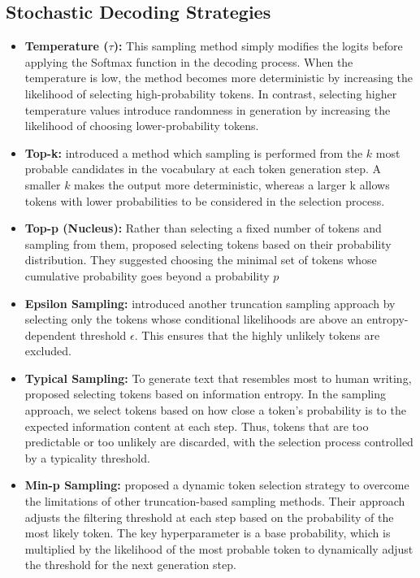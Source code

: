\subsection{Stochastic Decoding Strategies}
\label{stochastic decoding}

\begin{itemize}\itemsep0em 
    \item \textbf{Temperature (\( \tau\)):} This sampling method simply modifies the logits before applying the Softmax \cite{bridle} function in the decoding process. When the temperature is low, the method becomes more deterministic by increasing the likelihood of selecting high-probability tokens. In contrast, selecting higher temperature values introduce randomness in generation by increasing the likelihood of choosing lower-probability tokens.
    
    \item \textbf{Top-k:} \cite{topk} introduced a method which sampling is performed from the \( k\) most probable candidates in the vocabulary at each token generation step. A smaller \( k\) makes the output more deterministic, whereas a larger k allows tokens with lower probabilities to be considered in the selection process.
    
    \item \textbf{Top-p (Nucleus):} Rather than selecting a fixed number of tokens and sampling from them, \cite{topp} proposed selecting tokens based on their probability distribution. They suggested choosing the minimal set of tokens whose cumulative probability goes beyond a probability \( p\)
    
    \item \textbf{Epsilon Sampling:} \cite{epsilon} introduced another truncation sampling approach by selecting only the tokens whose conditional likelihoods are above an entropy-dependent threshold \( \epsilon\). This ensures that the highly unlikely tokens are excluded. 
    \item \textbf{Typical Sampling:} To generate text that resembles most to human writing, \cite{typical} proposed selecting tokens based on information entropy. In the sampling approach, we select tokens based on how close a token’s probability is to the expected information content at each step. Thus, tokens that are too predictable or too unlikely are discarded, with the selection process controlled by a typicality threshold.
    \item \textbf{Min-p Sampling:} \cite{eight} proposed a dynamic token selection strategy to overcome the limitations of other truncation-based sampling methods. Their approach adjusts the filtering threshold at each step based on the probability of the most likely token. The key hyperparameter is a base probability, which is multiplied by the likelihood of the most probable token to dynamically adjust the threshold for the next generation step. 
\end{itemize} 
